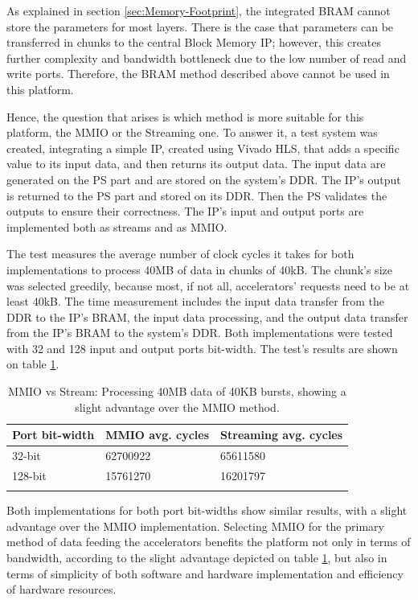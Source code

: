 As explained in section \ref{sec:Memory-Footprint}, the integrated BRAM cannot store the parameters for most layers. There is the case that parameters can be transferred in chunks to the central Block Memory IP; however, this creates further complexity and bandwidth bottleneck due to the low number of read and write ports. Therefore, the BRAM method described above cannot be used in this platform.

Hence, the question that arises is which method is more suitable for this platform, the MMIO or the Streaming one. To answer it, a test system was created, integrating a simple IP, created using Vivado HLS, that adds a specific value to its input data, and then returns its output data. The input data are generated on the PS part and are stored on the system's DDR. The IP's output is returned to the PS part and stored on its DDR. Then the PS validates the outputs to ensure their correctness. The IP's input and output ports are implemented both as streams and as MMIO.

The test measures the average number of clock cycles it takes for both implementations to process 40MB of data in chunks of 40kB. The chunk's size was selected greedily, because most, if not all, accelerators' requests need to be at least 40kB. The time measurement includes the input data transfer from the DDR to the IP's BRAM, the input data processing, and the output data transfer from the IP's BRAM to the system's DDR. Both implementations were tested with 32 and 128 input and output ports bit-width. The test's results are shown on table \ref{tab:MMIO-vs-Stream}.

\begin{table}[H]
	\caption[MMIO vs Stream]{MMIO vs Stream: Processing 40MB data of 40KB bursts, showing a slight advantage over the MMIO method.}
	\label{tab:MMIO-vs-Stream}
	\centering
	\begin{tabular}{lll}
		\toprule
		\textbf{Port bit-width} & \textbf{MMIO avg. cycles} & \textbf{Streaming avg. cycles}\\
		\midrule
			32-bit 	& 62700922 & 65611580\\
			128-bit & 15761270 & 16201797\\
		\bottomrule\\
	\end{tabular}
\end{table}

Both implementations for both port bit-widths show similar results, with a slight advantage over the MMIO implementation. Selecting MMIO for the primary method of data feeding the accelerators benefits the platform not only in terms of bandwidth, according to the slight advantage depicted on table \ref{tab:MMIO-vs-Stream}, but also in terms of simplicity of both software and hardware implementation and efficiency of hardware resources.

